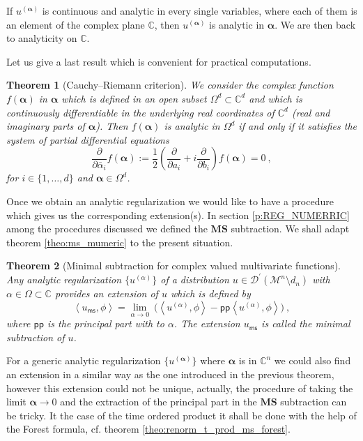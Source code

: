 \documentclass[11pt]{book}
\newcommand{\pp}{\mathsf{pp}}
\newcommand{\ms}{\mathsf{ms}}
\newcommand{\MS}{\textbf{MS}}
\newcommand{\alphabd}{\boldsymbol{\alpha}}
\newcommand{\sm}[1]{\left\langle#1\right\rangle}
\newcommand{\Dcal}{\mathcal{D}}
\newcommand{\Mcal}{\mathcal{M}}
\newcommand{\Cbb}{\mathbb{C}}
\theoremstyle{break}
\newtheorem{theorem}{Theorem}[chapter]
\begin{document}
If $u^{(\alphabd)}$ is continuous and analytic in every single variables, where each of them is an element of the complex plane $\Cbb$, then $u^{(\alphabd)}$ is analytic in $\alphabd$. We are then back to analyticity on $\Cbb$.


Let us give a last result which is convenient for practical computations. 


\begin{theorem}[Cauchy--Riemann criterion]
We consider the complex function $f(\alphabd)$ in $\alphabd$ which is defined in an open subset $\Omega^d \subset \Cbb^d$ and which is continuously differentiable in the underlying real coordinates of $\Cbb^d$ (real and imaginary parts of $\alphabd$). Then $f(\alphabd)$ is analytic in $\Omega^d$ if and only if it satisfies the system of partial differential equations
%
\begin{equation}
\frac{\partial}{\partial \bar{\alpha}_i} f(\alphabd) := \frac12 \left( \frac{\partial}{\partial a_i} + i \frac{\partial}{\partial b_i} \right) f(\alphabd) = 0 \ ,
\end{equation}
%
for $i\in\{1,\dots,d\}$ and $\alphabd\in\Omega^d$.
\end{theorem}


Once we obtain an analytic regularization we would like to have a procedure which gives us the corresponding extension(s). In section \ref{p:REG_NUMERRIC} among the procedures discussed we defined the $\MS$ subtraction. We shall adapt theorem \ref{theo:ms_mumeric} to the present situation.


\begin{theorem}[Minimal subtraction for complex valued multivariate functions]\label{theo:ms_general}
Any analytic regularization $\{u^{(\alpha)}\}$ of a distribution $u \in \Dcal^\prime(\Mcal^n\setminus d_n)$ with $\alpha\in\Omega\subset \Cbb$ provides an extension of $u$ which is defined by 
%
\begin{equation*}
\sm{u_\ms,\phi} = \lim_{\alpha \to 0} \ \bigg( \sm{u^{(\alpha)},\phi} - \pp\sm{u^{(\alpha)},\phi}\bigg) \ ,
\end{equation*}
%
where $\pp$ is the principal part with to $\alpha$. The extension $u_\ms$ is called the minimal subtraction of $u$.
\end{theorem}

For a generic analytic regularization $\{u^{(\alphabd)}\}$ where $\alphabd$ is in $\mathbb{C}^n$ we could also find an extension in a similar way as the one introduced in the previous theorem, however this extension could not be unique, actually, the procedure of taking the limit $\alphabd \to 0$ and the extraction of the principal part in the $\MS$ subtraction can be tricky. It the case of the time ordered product it shall be done with the help of the Forest formula, cf. theorem \ref{theo:renorm_t_prod_ms_forest}.
\end{document}
